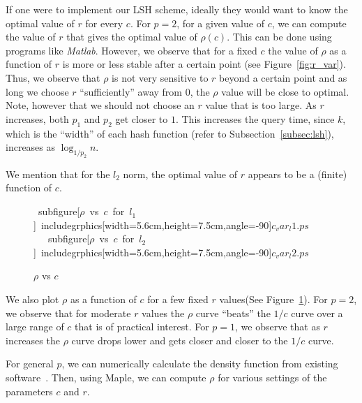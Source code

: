 \documentclass[12pt]{article}
\begin{document}
If one were to implement our LSH scheme, ideally they would want to know
the optimal value of $r$ for every $c$.  For $p=2$, for a given value
of $c$,
we can compute the value of $r$ that gives the optimal value of
$\rho(c)$. This can be done using programs like {\em Matlab}.
However, we
observe that for a fixed $c$ the value of $\rho$ as a function of $r$
is more or less stable after a certain point
(see Figure~\ref{fig:r_var}).
Thus, we observe that
$\rho$ is not very sensitive to $r$ beyond a certain point and as
long we choose $r$ ``sufficiently'' away from $0$, the $\rho$ value will be
close to optimal. Note, however that we should not choose an $r$ value that
is too large. As $r$ increases, both $p_1$ and $p_2$ get closer to
$1$. This increases the query time, since $k$, which is the
``width'' of each hash function (refer to Subsection~\ref{subsec:lsh}),
increases as $\log_{1/p_2} n$.

We mention that for the $l_2$ norm, the optimal value of $r$ appears to be a
(finite) function of $c$.

\begin{figure}[t]
\begin{center}
\mbox{
subfigure[$\rho$ vs $c$ for $l_1$]{
includegrphics[width=5.6cm,height=7.5cm,angle=-90]{$c_var_l1.ps$}
\label{Fig:c_var_l1}
} \quad
subfigure[$\rho$ vs $c$ for $l_2$]{
includegrphics[width=5.6cm,height=7.5cm,angle=-90]{$c_var_l2.ps$}
\label{Fig:c_var_l2}
}
}
\caption{$\rho$ vs $c$}
\label{fig:c_var}
\end{center}
\end{figure}

We also plot $\rho$ as a function of $c$ for a few fixed $r$ values(See
Figure~\ref{fig:c_var}). For $p=2$, we observe that for moderate $r$
values the $\rho$ curve ``beats'' the $1/c$ curve over a large range of
$c$ that is of practical interest. For $p=1$, we observe that as $r$
increases the $\rho$ curve drops lower and gets closer and closer to the
$1/c$ curve.

\iffalse
For general $p$, we can numerically calculate the density function from
existing software~\cite{Nol1}.  Then, using Maple, we can compute $\rho$
for various settings of the parameters $c$ and $r$.  
\end{document}
